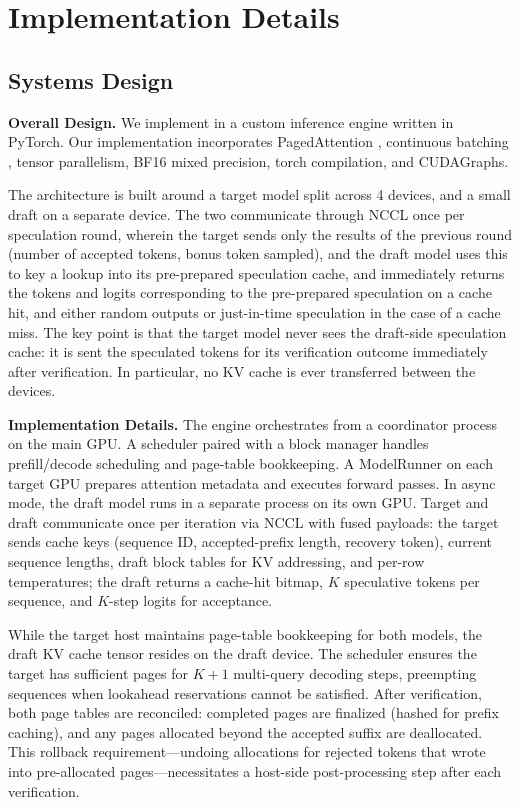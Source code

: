 \section{Implementation Details}
\label{app:impl_details}

\subsection{Systems Design}

\textbf{Overall Design. } We implement \Sys in a custom inference engine written in PyTorch. Our implementation incorporates PagedAttention \citep{kwon2023efficient}, continuous batching \citep{yu2022orca}, tensor parallelism, BF16 mixed precision, torch compilation, and CUDAGraphs.

The architecture is built around a target model split across 4 devices, and a small draft on a separate device. The two communicate through NCCL once per speculation round, wherein the target sends only the results of the previous round (number of accepted tokens, bonus token sampled), and the draft model uses this to key a lookup into its pre-prepared speculation cache, and immediately returns the tokens and logits corresponding to the pre-prepared speculation on a cache hit, and either random outputs or just-in-time speculation in the case of a cache miss. The key point is that the target model never sees the draft-side speculation cache: it is sent the speculated tokens for its verification outcome immediately after verification. In particular, no KV cache is ever transferred between the devices. 

\textbf{Implementation Details.}
The engine orchestrates from a coordinator process on the main GPU. A scheduler paired with a block manager handles prefill/decode scheduling and page-table bookkeeping. A ModelRunner on each target GPU prepares attention metadata and executes forward passes. In async mode, the draft model runs in a separate process on its own GPU. Target and draft communicate once per iteration via NCCL with fused payloads: the target sends cache keys (sequence ID, accepted-prefix length, recovery token), current sequence lengths, draft block tables for KV addressing, and per-row temperatures; the draft returns a cache-hit bitmap, $K$ speculative tokens per sequence, and $K$-step logits for acceptance.

While the target host maintains page-table bookkeeping for both models, the draft KV cache tensor resides on the draft device. The scheduler ensures the target has sufficient pages for $K+1$ multi-query decoding steps, preempting sequences when lookahead reservations cannot be satisfied. After verification, both page tables are reconciled: completed pages are finalized (hashed for prefix caching), and any pages allocated beyond the accepted suffix are deallocated. This rollback requirement—undoing allocations for rejected tokens that wrote into pre-allocated pages—necessitates a host-side post-processing step after each verification.

